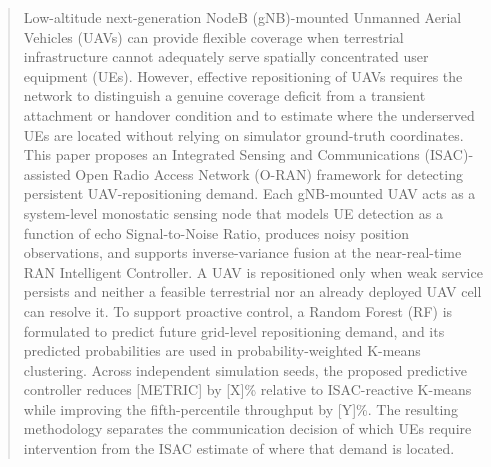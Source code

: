 %
%
%

\begin{abstract}
Low-altitude next-generation NodeB (gNB)-mounted Unmanned Aerial Vehicles
(UAVs) can provide flexible coverage when terrestrial infrastructure cannot
adequately serve spatially concentrated user equipment (UEs). However,
effective repositioning of UAVs requires the network to distinguish a genuine
coverage deficit from a transient attachment or handover condition and to
estimate where the underserved UEs are located without relying on simulator
ground-truth coordinates. This paper proposes an Integrated Sensing and
Communications (ISAC)-assisted Open Radio Access Network (O-RAN) framework for
detecting persistent UAV-repositioning demand. Each gNB-mounted UAV acts as a
system-level monostatic sensing node that models UE detection as a function of
echo Signal-to-Noise Ratio, produces noisy position observations, and supports
inverse-variance fusion at the near-real-time RAN Intelligent Controller. A
UAV is repositioned only when weak service persists and neither a feasible
terrestrial nor an already deployed UAV cell can resolve it. To support
proactive control, a Random Forest (RF) is formulated to predict future
grid-level repositioning demand, and its predicted probabilities are used in
probability-weighted K-means clustering. Across independent simulation seeds,
the proposed predictive controller reduces [METRIC] by [X]\% relative to
ISAC-reactive K-means while improving the fifth-percentile throughput by
[Y]\%. The resulting methodology separates the communication decision of
which UEs require intervention from the ISAC estimate of where that demand is
located.
\end{abstract}

